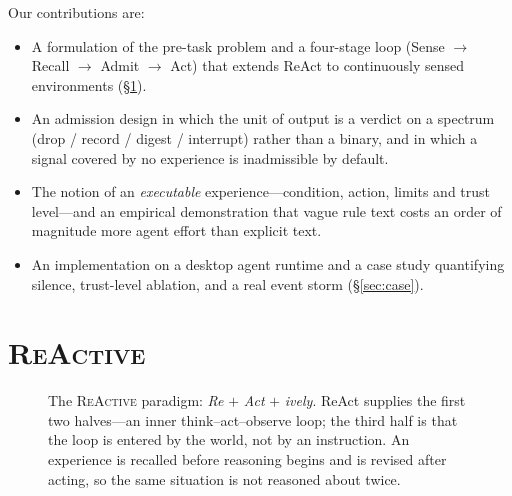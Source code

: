 \documentclass[10pt,a4paper]{article}
\newcommand{\sys}{\textsc{ReActive}}
\begin{document}
Our contributions are:
\begin{itemize}
\item A formulation of the pre-task problem and a four-stage loop
(Sense $\rightarrow$ Recall $\rightarrow$ Admit $\rightarrow$ Act) that
extends ReAct to continuously sensed environments (\S\ref{sec:method}).
\item An admission design in which the unit of output is a verdict on a
spectrum (drop / record / digest / interrupt) rather than a binary, and in
which a signal covered by no experience is inadmissible by default.
\item The notion of an \emph{executable} experience---condition, action,
limits and trust level---and an empirical demonstration that vague rule text
costs an order of magnitude more agent effort than explicit text.
\item An implementation on a desktop agent runtime and a case study
quantifying silence, trust-level ablation, and a real event storm
(\S\ref{sec:case}).
\end{itemize}

\section{\sys}
\label{sec:method}

\begin{figure}[t]
\centering
{}
\caption{The \sys{} paradigm: \emph{Re} $+$ \emph{Act} $+$ \emph{ively}. ReAct supplies the first two halves---an inner think--act--observe loop; the third half is that the loop is entered by the world, not by an instruction. An experience is recalled before reasoning begins and is revised after acting, so the same situation is not reasoned about twice.}
\label{fig:paradigm}
\end{figure}
\end{document}
